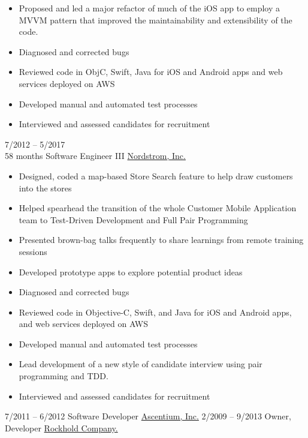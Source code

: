 \documentclass[9pt]{developercv} %
\begin{document}
\begin{entrylist}
{\begin{itemize}[noitemsep,topsep=0pt,parsep=0pt,partopsep=0pt, leftmargin=-1pt]
            \item Proposed and led a major refactor of much of the iOS app to employ a MVVM pattern that improved the maintainability and extensibility of the code.
            \item Diagnosed and corrected bugs
            \item Reviewed code in ObjC, Swift, Java for iOS and Android apps and web services deployed on AWS
            \item Developed manual and automated test processes
            \item Interviewed and assessed candidates for recruitment
        \end{itemize}}
	\entry
        {7/2012 -- 5/2017 \\\footnotesize{58 months}}
		{Software Engineer III}
		{\href{https://nordstrom.com/}{Nordstrom, Inc.}}
		{\vspace{-10pt}
        \begin{itemize}[noitemsep,topsep=0pt,parsep=0pt,partopsep=0pt, leftmargin=-1pt]
            \item Designed, coded a map-based Store Search feature to help draw customers into the stores
            \item Helped spearhead the transition of the whole Customer Mobile Application team to Test-Driven Development and Full Pair Programming
            \item Presented brown-bag talks frequently to share learnings from remote training sessions
            \item Developed prototype apps to explore potential product ideas
            \item Diagnosed and corrected bugs
            \item Reviewed code in Objective-C, Swift, and Java for iOS and Android apps, and web services deployed on AWS
            \item Developed manual and automated test processes
            \item Lead development of a new style of candidate interview using pair programming and TDD.
            \item Interviewed and assessed candidates for recruitment
        \end{itemize}}
	\entry
        {7/2011 -- 6/2012}
		{Software Developer}
		{\href{https://smithcommerce.com/}{Ascentium, Inc.}}
  		{\vspace{-10pt}}
	\entry
        {2/2009 -- 9/2013}
		{Owner, Developer}
		{\href{https://rockholdco.com/}{Rockhold Company.}}

\end{entrylist}
\end{document}
